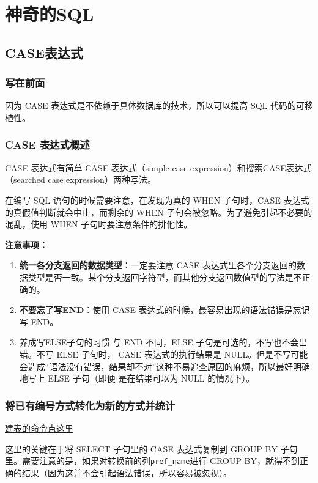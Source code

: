 \chapter{神奇的SQL}
\section{CASE表达式}
\subsection{写在前面}
因为 CASE 表达式是不依赖于具体数据库的技术，所以可以提高 SQL 代码的可移植性。
\subsection{CASE 表达式概述}
CASE 表达式有简单 CASE 表达式（simple case expression）和搜索CASE表达式（searched case expression）两种写法。

在编写 SQL 语句的时候需要注意，在发现为真的 WHEN 子句时，CASE 表达式的真假值判断就会中止，而剩余的 WHEN 子句会被忽略。为了避免引起不必要的混乱，使用 WHEN 子句时要注意条件的排他性。

\textbf{注意事项：}

\begin{enumerate}
    \item \textbf{统一各分支返回的数据类型}：一定要注意 CASE 表达式里各个分支返回的数据类型是否一致。某个分支返回字符型，而其他分支返回数值型的写法是不正确的。
    \item \textbf{不要忘了写END}：使用 CASE 表达式的时候，最容易出现的语法错误是忘记写 END。

    \item 养成写ELSE子句的习惯
          与 END 不同，ELSE 子句是可选的，不写也不会出错。不写 ELSE 子句时，
          CASE 表达式的执行结果是 NULL。但是不写可能会造成“语法没有错误，结果却不对”这种不易追查原因的麻烦，所以最好明确地写上 ELSE 子句（即便
          是在结果可以为 NULL 的情况下）。

\end{enumerate}


\subsection{将已有编号方式转化为新的方式并统计}

\href{https://github.com/JPL-JUNO/SQL/blob/main/ASQLP/PopTbl.sql}{建表的命令点这里}

这里的关键在于将 SELECT 子句里的 CASE 表达式复制到 GROUP BY
子句里。需要注意的是，如果对转换前的列\verb|pref_name|进行 GROUP
BY，就得不到正确的结果（因为这并不会引起语法错误，所以容易被忽视）。

